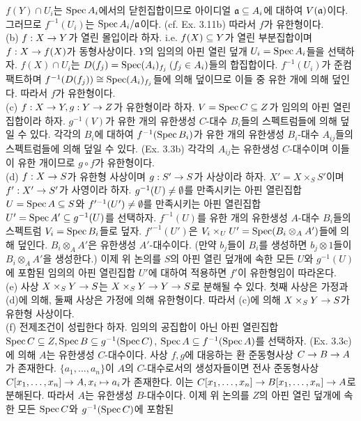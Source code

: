 \begin{enumerate}[label=\tb{3.\arabic*.},itemindent=0mm,itemsep=4mm]
	$f(Y)\cap U_i$는 $\operatorname{Spec} A_i$에서의 닫힌집합이므로 아이디얼 $\mathfrak{a}\subseteq A_i$에 대하여 $V(\mathfrak{a})$이다.
	그러므로 $f^{-1}(U_i)$는 $\operatorname{Spec} A_i/\mathfrak{a}$이다. (cf. Ex. 3.11b) 따라서 $f$가 유한형이다.\\
	(b) $f:X\rightarrow Y$가 열린 몰입이라 하자. i.e. $f(X)\subseteq Y$가 열린 부분집합이며 $f:X\rightarrow f(X)$가 동형사상이다.
	$Y$의 임의의 아핀 열린 덮개 $U_i=\operatorname{Spec} A_i$들을 선택하자.
	$f(X)\cap U_i$는 $D(f_j)=\operatorname{Spec} (A_i)_{f_j}\:(f_j\in A_i)$들의 합집합이다.
	$f^{-1}(U_i)$가 준컴팩트하며 $f^{-1}(D(f_j))\cong\operatorname{Spec}(A_i)_{f_j}$들에 의해 덮이므로 이들 중 유한 개에 의해 덮인다.
	따라서 $f$가 유한형이다.\\
	(c) $f:X\rightarrow Y,g:Y\rightarrow Z$가 유한형이라 하자. $V=\operatorname{Spec} C\subseteq Z$가 임의의 아핀 열린집합이라 하자.
	$g^{-1}(V)$가 유한 개의 유한생성 $C$-대수 $B_i$들의 스펙트럼들에 의해 덮일 수 있다.
	각각의 $B_i$에 대하여 $f^{-1}(\operatorname{Spec} B_i)$가 유한 개의 유한생성 $B_i$-대수 $A_{ij}$들의 스펙트럼들에 의해 덮일 수 있다.
	(Ex. 3.3b) 각각의 $A_{ij}$는 유한생성 $C$-대수이며 이들이 유한 개이므로 $g\circ f$가 유한형이다.\\
	(d) $f:X\rightarrow S$가 유한형 사상이며 $g:S'\rightarrow S$가 사상이라 하자. $X'=X\times_SS'$이며 $f':X'\rightarrow S'$가 사영이라 하자.
	$g^{-1}(U)\ne\emptyset$를 만족시키는 아핀 열린집합 $U=\operatorname{Spec} A\subseteq S$와
	$f'^{-1}(U')\ne\emptyset$를 만족시키는 아핀 열린집합 $U'=\operatorname{Spec} A'\subseteq g^{-1}(U)$를 선택하자.
	$f^{-1}(U)$를 유한 개의 유한생성 $A$-대수 $B_i$들의 스펙트럼 $V_i=\operatorname{Spec} B_i$들로 덮자.
	$f'^{-1}(U')$은 $V_i\times_UU'=\operatorname{Spec}(B_i\otimes_AA')$들에 의해 덮인다.
	$B_i\otimes_AA'$은 유한생성 $A'$-대수이다. (만약 $b_j$들이 $B_i$를 생성하면 $b_j\otimes 1$들이 $B_i\otimes_AA'$을 생성한다.)
	이제 위 논의를 $S$의 아핀 열린 덮개에 속한 모든 $U$와 $g^{-1}(U)$에 포함된 임의의 아핀 열린집합 $U'$에 대하여 적용하면
	$f'$이 유한형임이 따라온다.\\
	(e) 사상 $X\times_SY\rightarrow S$는 $X\times_SY\rightarrow Y\rightarrow S$로 분해될 수 있다.
	첫째 사상은 가정과 (d)에 의해, 둘째 사상은 가정에 의해 유한형이다. 따라서 (c)에 의해 $X\times_SY\rightarrow S$가 유한형 사상이다.\\
	(f) 전제조건이 성립한다 하자. 임의의 공집합이 아닌 아핀 열린집합
	$\operatorname{Spec} C\subseteq Z,\operatorname{Spec} B\subseteq g^{-1}(\operatorname{Spec} C)$, $\operatorname{Spec} A\subseteq f^{-1}(\operatorname{Spec} A)$를 선택하자.
	(Ex. 3.3c)에 의해 $A$는 유한생성 $C$-대수이다. 사상 $f,g$에 대응하는 환 준동형사상 $C\rightarrow B\rightarrow A$가 존재한다.
	$\{a_1,\ldots,a_n\}$이 $A$의 $C$-대수로서의 생성자들이면 전사 준동형사상 $C[x_1,\ldots,x_n]\rightarrow A,x_i\mapsto a_i$가 존재한다.
	이는 $C[x_1,\ldots,x_n]\rightarrow B[x_1,\ldots,x_n]\rightarrow A$로 분해된다. 따라서 $A$는 유한생성 $B$-대수이다.
	이제 위 논의를 $Z$의 아핀 열린 덮개에 속한 모든 $\operatorname{Spec} C$와 $g^{-1}(\operatorname{Spec} C)$에 포함된

\end{enumerate}
